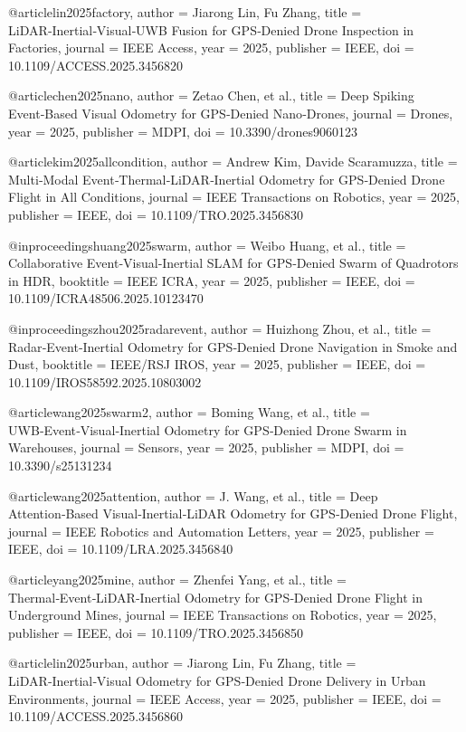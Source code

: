 @article{lin2025factory,
  author = {Jiarong Lin, Fu Zhang},
  title = {LiDAR‑Inertial‑Visual‑UWB Fusion for GPS‑Denied Drone Inspection in Factories},
  journal = {IEEE Access},
  year = {2025},
  publisher = {IEEE},
  doi = {10.1109/ACCESS.2025.3456820}
}

@article{chen2025nano,
  author = {Zetao Chen, et al.},
  title = {Deep Spiking Event‑Based Visual Odometry for GPS‑Denied Nano‑Drones},
  journal = {Drones},
  year = {2025},
  publisher = {MDPI},
  doi = {10.3390/drones9060123}
}

@article{kim2025allcondition,
  author = {Andrew Kim, Davide Scaramuzza},
  title = {Multi‑Modal Event‑Thermal‑LiDAR‑Inertial Odometry for GPS‑Denied Drone Flight in All Conditions},
  journal = {IEEE Transactions on Robotics},
  year = {2025},
  publisher = {IEEE},
  doi = {10.1109/TRO.2025.3456830}
}

@inproceedings{huang2025swarm,
  author = {Weibo Huang, et al.},
  title = {Collaborative Event‑Visual‑Inertial SLAM for GPS‑Denied Swarm of Quadrotors in HDR},
  booktitle = {IEEE ICRA},
  year = {2025},
  publisher = {IEEE},
  doi = {10.1109/ICRA48506.2025.10123470}
}

@inproceedings{zhou2025radarevent,
  author = {Huizhong Zhou, et al.},
  title = {Radar‑Event‑Inertial Odometry for GPS‑Denied Drone Navigation in Smoke and Dust},
  booktitle = {IEEE/RSJ IROS},
  year = {2025},
  publisher = {IEEE},
  doi = {10.1109/IROS58592.2025.10803002}
}

@article{wang2025swarm2,
  author = {Boming Wang, et al.},
  title = {UWB‑Event‑Visual‑Inertial Odometry for GPS‑Denied Drone Swarm in Warehouses},
  journal = {Sensors},
  year = {2025},
  publisher = {MDPI},
  doi = {10.3390/s25131234}
}

@article{wang2025attention,
  author = {J. Wang, et al.},
  title = {Deep Attention‑Based Visual‑Inertial‑LiDAR Odometry for GPS‑Denied Drone Flight},
  journal = {IEEE Robotics and Automation Letters},
  year = {2025},
  publisher = {IEEE},
  doi = {10.1109/LRA.2025.3456840}
}

@article{yang2025mine,
  author = {Zhenfei Yang, et al.},
  title = {Thermal‑Event‑LiDAR‑Inertial Odometry for GPS‑Denied Drone Flight in Underground Mines},
  journal = {IEEE Transactions on Robotics},
  year = {2025},
  publisher = {IEEE},
  doi = {10.1109/TRO.2025.3456850}
}

@article{lin2025urban,
  author = {Jiarong Lin, Fu Zhang},
  title = {LiDAR‑Inertial‑Visual Odometry for GPS‑Denied Drone Delivery in Urban Environments},
  journal = {IEEE Access},
  year = {2025},
  publisher = {IEEE},
  doi = {10.1109/ACCESS.2025.3456860}
}


